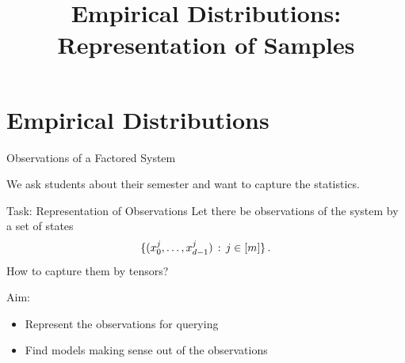 \documentclass{beamer}
\title[Empirical Distributions]{
	\coursechaptertwo \\
	{\huge Empirical Distributions: Representation of Samples}
}
\begin{document}
{\frame[plain]{\titlepage}}



%
%
%
%
%
%
%
%
%
%
%
%



\section{Empirical Distributions}


\begin{frame}{Observations of a Factored System}

\begin{example}
	We ask students about their semester and want to capture the statistics.
\end{example}

\begin{block}{Task: Representation of Observations}
	Let there be observations of the system by a set of states
		\[ \{({x_{0}^{j},\ldots,x_{d-1}^{j}}) \, : \, j\in[m] \} \, . \]
	How to capture them by tensors?
\end{block}

Aim: 
\begin{itemize}
	\item Represent the observations for querying
	\item Find models making sense out of the observations
\end{itemize}

\end{frame}
\end{document}
